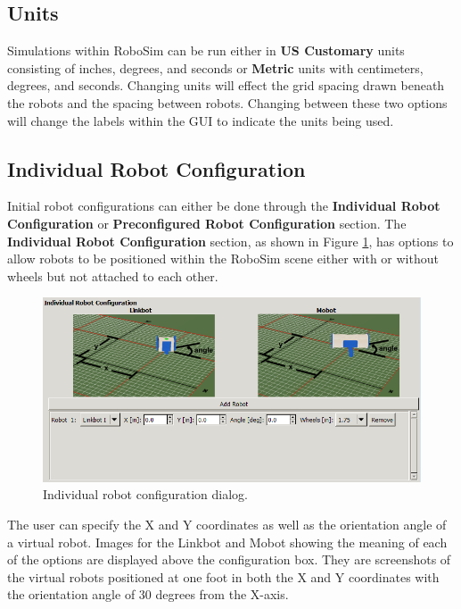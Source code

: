 \documentclass{article}
\begin{document}
\subsection{Units}
\label{sec:units}
Simulations within RoboSim can be run either in {\bf US Customary} units
consisting of inches, degrees, and seconds or {\bf Metric} units with
centimeters, degrees, and seconds.  Changing units will effect the grid spacing
drawn beneath the robots and the spacing between robots.  Changing between these
two options will change the labels within the GUI to indicate the units being
used.


\subsection{Individual Robot Configuration}
Initial robot configurations can either be done through the {\bf Individual
Robot Configuration} or {\bf Preconfigured Robot Configuration} section.  The
{\bf Individual Robot Configuration} section, as shown in Figure
\ref{fig:config}, has options to allow robots to be positioned within the
RoboSim scene either with or without wheels but not attached to each other.
\begin{figure}[H]
	\begin{center}
		\includegraphics[width=6in]{images/individual}
	\end{center}
	\caption{Individual robot configuration dialog.}
	\label{fig:config}
\end{figure}

The user can specify the X and Y coordinates  as well as the orientation angle
of a virtual robot.  Images for the Linkbot and Mobot showing the meaning of
each of the options are displayed above the configuration box.  They are
screenshots of the virtual robots positioned at one foot in both the X and Y
coordinates with the orientation angle of 30 degrees from the X-axis.
\end{document}
